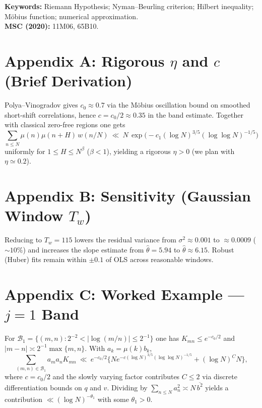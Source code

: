 \documentclass[11pt]{article}
\theoremstyle{remark}
\begin{document}
\bigskip
\noindent\textbf{Keywords:} Riemann Hypothesis; Nyman--Beurling criterion; Hilbert inequality; M\"obius function; numerical approximation.\\
\noindent\textbf{MSC (2020):} 11M06, 65B10.

\appendix

\section*{Appendix A: Rigorous $\eta$ and $c$ (Brief Derivation)}
Polya--Vinogradov gives $c_0\approx 0.7$ via the M\"obius oscillation bound on smoothed short-shift correlations, hence $c=c_0/2\approx 0.35$ in the band estimate. Together with classical zero-free regions one gets
\begin{equation*}
\sum_{n\le N}\mu(n)\mu(n+H)\,w(n/N)\ \ll\ N\,\exp\!\Big(-c_1(\log N)^{3/5}(\log\log N)^{-1/5}\Big)
\end{equation*}
uniformly for $1\le H\le N^\beta$ ($\beta<1$), yielding a rigorous $\eta>0$ (we plan with $\eta\simeq 0.2$).

\section*{Appendix B: Sensitivity (Gaussian Window $T_w$)}
Reducing to $T_w=115$ lowers the residual variance from $\sigma^2\approx 0.001$ to $\approx 0.0009$ ($\sim10\%$) and increases the slope estimate from $\widehat{\theta}=5.94$ to $\widehat{\theta}\approx 6.15$. Robust (Huber) fits remain within $\pm 0.1$ of OLS across reasonable windows.

\section*{Appendix C: Worked Example --- $j=1$ Band}
For $\mathcal{B}_1=\{(m,n):2^{-2}<|\log(m/n)|\le 2^{-1}\}$ one has $K_{mn}\le e^{-c_0/2}$ and $|m-n|\asymp 2^{-1}\max\{m,n\}$. With $a_k=\mu(k)b_k$,
\begin{equation*}
\sum_{(m,n)\in\mathcal{B}_1}\! a_ma_nK_{mn}
\ \ll\ e^{-c_0/2}\Big\{Ne^{-c(\log N)^{3/5}(\log\log N)^{-1/5}}+(\log N)^{C}N\Big\},
\end{equation*}
where $c=c_0/2$ and the slowly varying factor contributes $C\le 2$ via discrete differentiation bounds on $q$ and $v$. Dividing by $\sum_{n\le N} a_n^2\asymp N\,\overline{b^2}$ yields a contribution $\ll(\log N)^{-\theta_1}$ with some $\theta_1>0$.
\end{document}

